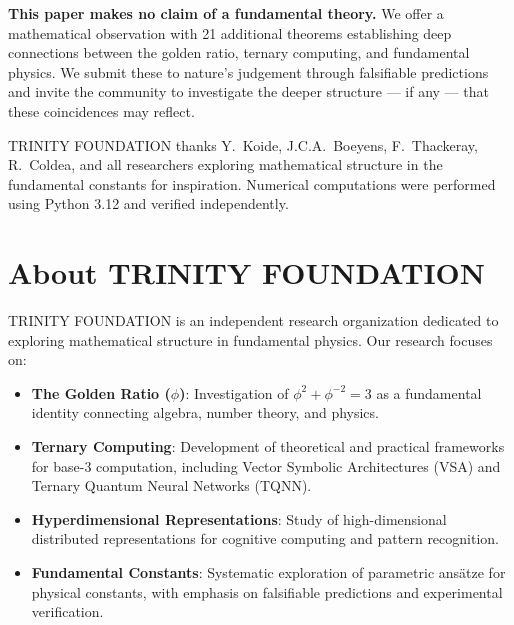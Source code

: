 \documentclass[aps,prd,preprint,superscriptaddress,showpacs,nofootinbib,longbibliography]{revtex4-2}
\begin{document}
\textbf{This paper makes no claim of a fundamental theory.} We offer a mathematical observation with 21 additional theorems establishing deep connections between the golden ratio, ternary computing, and fundamental physics. We submit these to nature's judgement through falsifiable predictions and invite the community to investigate the deeper structure --- if any --- that these coincidences may reflect.

\begin{acknowledgments}
TRINITY FOUNDATION thanks Y.~Koide, J.C.A.~Boeyens, F.~Thackeray, R.~Coldea, and all researchers exploring mathematical structure in the fundamental constants for inspiration. Numerical computations were performed using Python 3.12 and verified independently.
\end{acknowledgments}

\section*{About TRINITY FOUNDATION}
\label{sec:foundation}

TRINITY FOUNDATION is an independent research organization dedicated to exploring mathematical structure in fundamental physics. Our research focuses on:

\begin{itemize}[itemsep=2pt]
    \item \textbf{The Golden Ratio ($\phi$)}: Investigation of $\phi^2 + \phi^{-2} = 3$ as a fundamental identity connecting algebra, number theory, and physics.

    \item \textbf{Ternary Computing}: Development of theoretical and practical frameworks for base-3 computation, including Vector Symbolic Architectures (VSA) and Ternary Quantum Neural Networks (TQNN).

    \item \textbf{Hyperdimensional Representations}: Study of high-dimensional distributed representations for cognitive computing and pattern recognition.

    \item \textbf{Fundamental Constants}: Systematic exploration of parametric ansätze for physical constants, with emphasis on falsifiable predictions and experimental verification.
\end{itemize}
\end{document}
